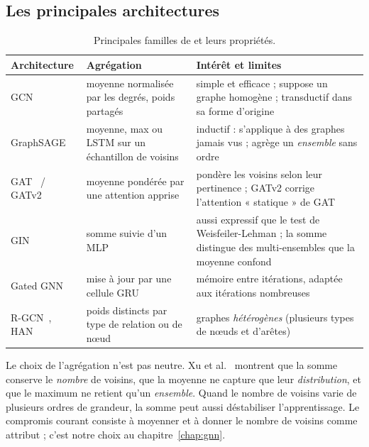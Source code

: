 \subsection{Les principales architectures}
\begin{table}[H]
\centering\small
\begin{tabularx}{\linewidth}{@{}>{\raggedright}p{2.6cm}>{\raggedright}X>{\raggedright\arraybackslash}X@{}}
\toprule
Architecture & Agrégation & Intérêt et limites\\
\midrule
GCN~\cite{gcn} & moyenne normalisée par les degrés, poids partagés & simple et efficace ; suppose un graphe homogène ; transductif dans sa forme d'origine\\
GraphSAGE~\cite{sage} & moyenne, max ou LSTM sur un échantillon de voisins & inductif : s'applique à des graphes jamais vus ; agrège un \emph{ensemble} sans ordre\\
GAT~\cite{gat} / GATv2~\cite{gatv2} & moyenne pondérée par une attention apprise & pondère les voisins selon leur pertinence ; GATv2 corrige l'attention « statique » de GAT\\
GIN~\cite{gin} & somme suivie d'un MLP & aussi expressif que le test de Weisfeiler-Lehman ; la somme distingue des multi-ensembles que la moyenne confond\\
Gated GNN~\cite{ggnn} & mise à jour par une cellule GRU~\cite{gru} & mémoire entre itérations, adaptée aux itérations nombreuses\\
R-GCN~\cite{rgcn}, HAN~\cite{han} & poids distincts par type de relation ou de nœud & graphes \emph{hétérogènes} (plusieurs types de nœuds et d'arêtes)\\
\bottomrule
\end{tabularx}
\caption{Principales familles de \gnn{} et leurs propriétés.}
\label{tab:gnnfamilies}
\end{table}
Le choix de l'agrégation n'est pas neutre. Xu et al.~\cite{gin} montrent que la somme conserve le \emph{nombre} de voisins, que la moyenne ne capture que leur \emph{distribution}, et que le maximum ne retient qu'un \emph{ensemble}. Quand le nombre de voisins varie de plusieurs ordres de grandeur, la somme peut aussi déstabiliser l'apprentissage. Le compromis courant consiste à moyenner et à donner le nombre de voisins comme attribut ; c'est notre choix au chapitre~\ref{chap:gnn}.

